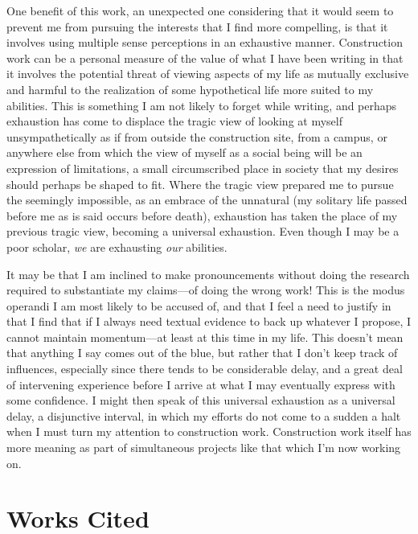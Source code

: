 \documentclass[
]{memoir}
\begin{document}
One benefit of this work, an unexpected one considering that it would
seem to prevent me from pursuing the interests that I find more
compelling, is that it involves using multiple sense perceptions in an
exhaustive manner. Construction work can be a personal measure of the
value of what I have been writing in that it involves the potential
threat of viewing aspects of my life as mutually exclusive and harmful
to the realization of some hypothetical life more suited to my
abilities. This is something I am not likely to forget while writing,
and perhaps exhaustion has come to displace the tragic view of looking
at myself unsympathetically as if from outside the construction site,
from a campus, or anywhere else from which the view of myself as a
social being will be an expression of limitations, a small circumscribed
place in society that my desires should perhaps be shaped to fit. Where
the tragic view prepared me to pursue the seemingly impossible, as an
embrace of the unnatural (my solitary life passed before me as is said
occurs before death), exhaustion has taken the place of my previous
tragic view, becoming a universal exhaustion. Even though I may be a
poor scholar, \emph{we} are exhausting \emph{our} abilities.

It may be that I am inclined to make pronouncements without doing the
research required to substantiate my claims---of doing the wrong work!
This is the modus operandi I am most likely to be accused of, and that I
feel a need to justify in that I find that if I always need textual
evidence to back up whatever I propose, I cannot maintain momentum---at
least at this time in my life. This doesn't mean that anything I say
comes out of the blue, but rather that I don't keep track of influences,
especially since there tends to be considerable delay, and a great deal
of intervening experience before I arrive at what I may eventually
express with some confidence. I might then speak of this universal
exhaustion as a universal delay, a disjunctive interval, in which my
efforts do not come to a sudden a halt when I must turn my attention to
construction work. Construction work itself has more meaning as part of
simultaneous projects like that which I'm now working on.

\hypertarget{works-cited}{%
\section*{Works Cited}\label{works-cited}}
\end{document}

